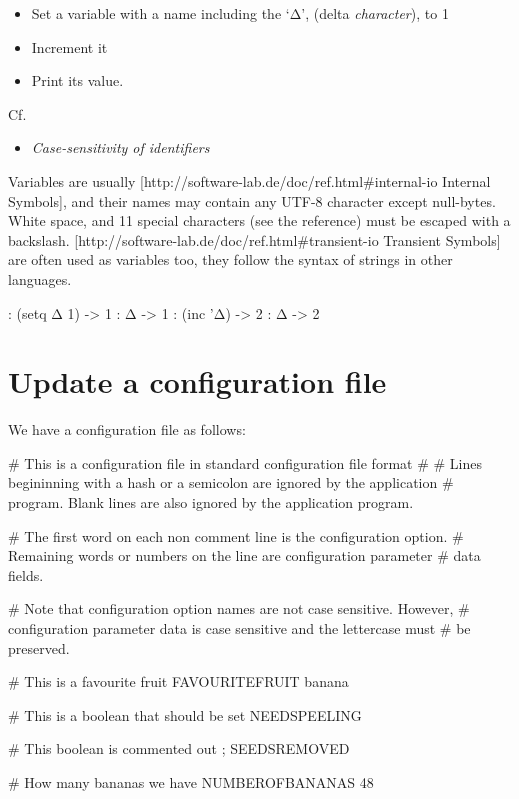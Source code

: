 \begin{itemize}
\item
  Set a variable with a name including the `Δ', (delta
  \emph{character}), to 1
\item
  Increment it
\item
  Print its value.
\end{itemize}

\begin{description}
\item[Cf.]
\end{description}

\begin{itemize}
\item
  \emph{Case-sensitivity of
  identifiers}
\end{itemize}

\begin{wideverbatim}

Variables are usually
[http://software-lab.de/doc/ref.html#internal-io Internal Symbols],
and their names may contain any UTF-8 character except null-bytes.
White space, and 11 special characters (see the reference) must be
escaped with a backslash.
[http://software-lab.de/doc/ref.html#transient-io Transient Symbols]
are often used as variables too, they follow the syntax of strings
in other languages.

: (setq Δ 1)
-> 1
: Δ
-> 1
: (inc 'Δ)
-> 2
: Δ
-> 2

\end{wideverbatim}

\pagebreak{}
\section*{Update a configuration file}

We have a configuration file as follows:

\begin{wideverbatim}
# This is a configuration file in standard configuration file format
#
# Lines begininning with a hash or a semicolon are ignored by the application
# program. Blank lines are also ignored by the application program.

# The first word on each non comment line is the configuration option.
# Remaining words or numbers on the line are configuration parameter
# data fields.

# Note that configuration option names are not case sensitive. However,
# configuration parameter data is case sensitive and the lettercase must
# be preserved.

# This is a favourite fruit
FAVOURITEFRUIT banana

# This is a boolean that should be set
NEEDSPEELING

# This boolean is commented out
; SEEDSREMOVED

# How many bananas we have
NUMBEROFBANANAS 48
\end{wideverbatim}

